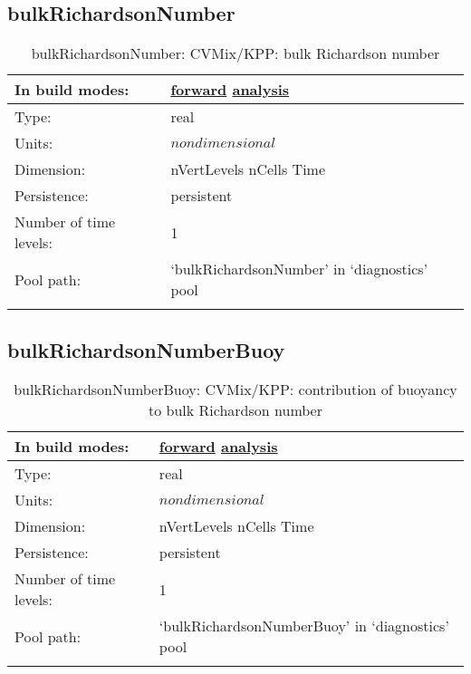 \subsection[bulkRichardsonNumber]{bulkRichardsonNumber}
\label{subsec:var_sec_diagnostics_bulkRichardsonNumber}
\begin{center}
\begin{longtable}{| p{2.0in} | p{4.0in} |}
        \hline 
        In build modes: & \hyperref[subsec:forward_var_tab_diagnostics]{forward} \hyperref[subsec:analysis_var_tab_diagnostics]{analysis} \\
        \hline 
        Type: & real \\
        \hline 
        Units: & $nondimensional$ \\
        \hline 
        Dimension: & nVertLevels nCells Time \\
        \hline 
        Persistence: & persistent \\
        \hline 
        Number of time levels: & 1 \\
        \hline 
            Pool path: & `bulkRichardsonNumber' in `diagnostics' pool \\
		 \hline 
    \caption{bulkRichardsonNumber: CVMix/KPP: bulk Richardson number}
\end{longtable}
\end{center}
\subsection[bulkRichardsonNumberBuoy]{bulkRichardsonNumberBuoy}
\label{subsec:var_sec_diagnostics_bulkRichardsonNumberBuoy}
\begin{center}
\begin{longtable}{| p{2.0in} | p{4.0in} |}
        \hline 
        In build modes: & \hyperref[subsec:forward_var_tab_diagnostics]{forward} \hyperref[subsec:analysis_var_tab_diagnostics]{analysis} \\
        \hline 
        Type: & real \\
        \hline 
        Units: & $nondimensional$ \\
        \hline 
        Dimension: & nVertLevels nCells Time \\
        \hline 
        Persistence: & persistent \\
        \hline 
        Number of time levels: & 1 \\
        \hline 
            Pool path: & `bulkRichardsonNumberBuoy' in `diagnostics' pool \\
		 \hline 
    \caption{bulkRichardsonNumberBuoy: CVMix/KPP: contribution of buoyancy to bulk Richardson number}
\end{longtable}
\end{center}
